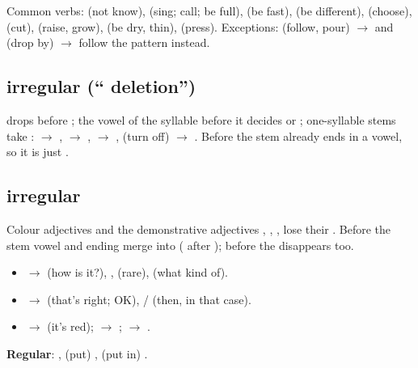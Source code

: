 \begin{center}
\end{center}

Common  verbs:  (not know),  (sing; call; be full),
 (be fast),  (be different),  (choose), 
(cut),  (raise, grow),  (be dry, thin),  (press).
Exceptions:  (follow, pour) $\to$  and  (drop by)
$\to$  follow the  pattern instead.

\subsection{ irregular (`` deletion'')}

 drops before ; the vowel of the syllable before it decides
 or ; one-syllable stems take :  $\to$ ,
 $\to$ ,  $\to$ ,  (turn off) $\to$
. Before  the stem already ends in a vowel, so it is just
.

\subsection{ irregular}

Colour adjectives and the demonstrative adjectives , ,
,  lose their . Before  the stem vowel and
ending merge into  ( after ); before  the 
disappears too.
\begin{itemize}
  \item {} $\to$  (how is it?), , 
        (rare),  (what kind of).
  \item {} $\to$  (that's right; OK),  / 
        (then, in that case).
  \item {} $\to$  (it's red);  $\to$ ;
         $\to$ .
\end{itemize}
\textbf{Regular}:  ,  (put) , 
(put in) .


